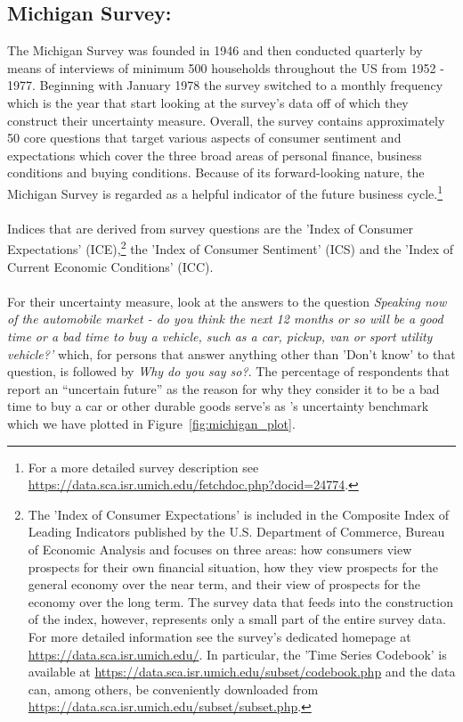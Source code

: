 \documentclass[a4paper,12pt,oneside,pointednumbers,bibtotoc,bigheadings,liststotoc]{scrbook}
\begin{document}
\subsection{Michigan Survey: \citet{leducandliu:16}}
\label{sec:michigansurvey}

The Michigan Survey was founded in 1946 and then conducted quarterly by means of interviews of minimum 500 households throughout the US from 1952 - 1977. Beginning with January 1978 the survey switched to a monthly frequency which is the year that \citet{leducandliu:16} start looking at the survey's data off of which they construct their uncertainty measure. Overall, the survey contains approximately 50 core questions that target various aspects of consumer sentiment and expectations which cover the three broad areas of personal finance, business conditions and buying conditions. Because of its forward-looking nature, the Michigan Survey is regarded as a helpful indicator of the future business cycle.\footnote{For a more detailed survey description see \url{https://data.sca.isr.umich.edu/fetchdoc.php?docid=24774}.}\\
\\
Indices that are derived from survey questions are the 'Index of Consumer Expectations' (ICE),\footnote{The 'Index of Consumer Expectations' is included in the Composite Index of Leading Indicators published by the U.S. Department of Commerce, Bureau of Economic Analysis and focuses on three areas: how consumers view prospects for their own financial situation, how they view prospects for the general economy over the near term, and their view of prospects for the economy over the long term. The survey data that feeds into the construction of the index, however, represents only a small part of the entire survey data. For more detailed information see the survey's dedicated homepage at \url{https://data.sca.isr.umich.edu/}. In particular, the 'Time Series Codebook' is available at \url{https://data.sca.isr.umich.edu/subset/codebook.php} and the data can, among others, be conveniently downloaded from \url{https://data.sca.isr.umich.edu/subset/subset.php}.} the 'Index of Consumer Sentiment' (ICS) and the 'Index of Current Economic Conditions' (ICC).\\
\\
For their uncertainty measure, \citet{leducandliu:16} look at the answers to the question \textit{Speaking now of the automobile market - do you think the next 12 months or so will be a good time or a bad time to buy a vehicle, such as a car, pickup, van or sport utility vehicle?'} which, for persons that answer anything other than 'Don't know' to that question, is followed by \textit{Why do you say so?}. The percentage of respondents that report an ``uncertain future'' as the reason for why they consider it to be a bad time to buy a car or other durable goods serve's as \citet{leducandlui:16}'s uncertainty benchmark which we have plotted in Figure~\ref{fig:michigan_plot}.
\end{document}
